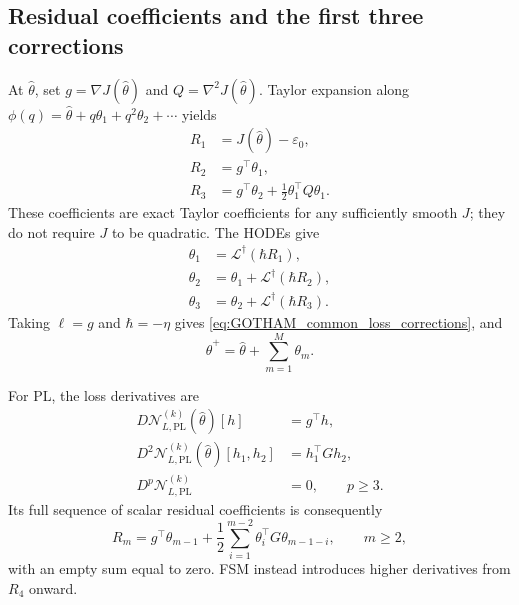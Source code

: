 \subsection{Residual coefficients and the first three corrections}

At $\hat\theta$, set $g=\nabla J(\hat\theta)$ and
$Q=\nabla^2J(\hat\theta)$. Taylor expansion along
$\phi(q)=\hat\theta+q\theta_1+q^2\theta_2+\cdots$ yields
\begin{align}
\label{eq:loss_root_R1}
    R_1&=J(\hat\theta)-\varepsilon_0,\\
\label{eq:loss_root_R2}
    R_2&=g^\top\theta_1,\\
\label{eq:loss_root_R3}
    R_3&=g^\top\theta_2+\tfrac12\theta_1^\top Q\theta_1.
\end{align}
These coefficients are exact Taylor coefficients for any sufficiently
smooth $J$; they do not require $J$ to be quadratic. The HODEs give
\begin{align}
\label{eq:loss_root_theta1}
    \theta_1&=\mathcal L^\dagger(\hbar R_1),\\
\label{eq:loss_root_theta2}
    \theta_2&=\theta_1+\mathcal L^\dagger(\hbar R_2),\\
\label{eq:loss_root_theta3}
    \theta_3&=\theta_2+\mathcal L^\dagger(\hbar R_3).
\end{align}
Taking $\ell=g$ and $\hbar=-\eta$ gives
\eqref{eq:GOTHAM_common_loss_corrections}, and
\begin{equation}
\label{eq:loss_root_update}
    \hat\theta^+=\hat\theta+\sum_{m=1}^{M}\theta_m.
\end{equation}

For PL, the loss derivatives are
\begin{equation}
\label{eq:loss_root_derivatives}
\begin{aligned}
    D\mathcal N_{L,\mathrm{PL}}^{(k)}(\hat\theta)[h]&=g^\top h,\\
    D^2\mathcal N_{L,\mathrm{PL}}^{(k)}(\hat\theta)[h_1,h_2]&=h_1^\top Gh_2,\\
    D^p\mathcal N_{L,\mathrm{PL}}^{(k)}&=0,\qquad p\ge3.
\end{aligned}
\end{equation}
Its full sequence of scalar residual coefficients is consequently
\begin{equation}
\label{eq:PL_loss_arbitrary_order}
    R_m=g^\top\theta_{m-1}
       +\frac12\sum_{i=1}^{m-2}\theta_i^\top G\theta_{m-1-i},
    \qquad m\ge2,
\end{equation}
with an empty sum equal to zero. FSM instead introduces higher
derivatives from $R_4$ onward.

